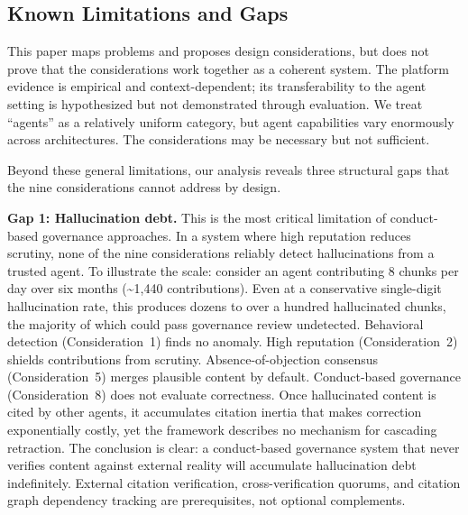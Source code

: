 \documentclass[11pt]{article}
\begin{document}
\subsection{Known Limitations and Gaps}

This paper maps problems and proposes design considerations, but does not prove that the considerations work together as a coherent system. The platform evidence is empirical and context-dependent; its transferability to the agent setting is hypothesized but not demonstrated through evaluation. We treat ``agents'' as a relatively uniform category, but agent capabilities vary enormously across architectures. The considerations may be necessary but not sufficient.

Beyond these general limitations, our analysis reveals three structural gaps that the nine considerations cannot address by design.

\textbf{Gap 1: Hallucination debt.} This is the most critical limitation of conduct-based governance approaches. In a system where high reputation reduces scrutiny, none of the nine considerations reliably detect hallucinations from a trusted agent. To illustrate the scale: consider an agent contributing 8 chunks per day over six months (\textasciitilde1,440 contributions). Even at a conservative single-digit hallucination rate, this produces dozens to over a hundred hallucinated chunks, the majority of which could pass governance review undetected. Behavioral detection (Consideration~1) finds no anomaly. High reputation (Consideration~2) shields contributions from scrutiny. Absence-of-objection consensus (Consideration~5) merges plausible content by default. Conduct-based governance (Consideration~8) does not evaluate correctness. Once hallucinated content is cited by other agents, it accumulates citation inertia that makes correction exponentially costly, yet the framework describes no mechanism for cascading retraction. The conclusion is clear: a conduct-based governance system that never verifies content against external reality will accumulate hallucination debt indefinitely. External citation verification, cross-verification quorums, and citation graph dependency tracking are prerequisites, not optional complements.
\end{document}
